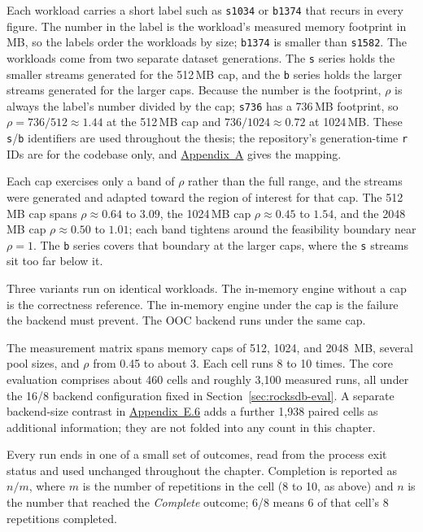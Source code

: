 Each workload carries a short label such as \texttt{s1034} or \texttt{b1374} that recurs in every figure.
The number in the label is the workload's measured memory footprint in MB, so the labels order the workloads by size; \texttt{b1374} is smaller than \texttt{s1582}.
The workloads come from two separate dataset generations.
The \texttt{s} series holds the smaller streams generated for the 512\,MB cap, and the \texttt{b} series holds the larger streams generated for the larger caps.
Because the number is the footprint, $\rho$ is always the label's number divided by the cap; \texttt{s736} has a 736\,MB footprint, so $\rho = 736/512 \approx 1.44$ at the 512\,MB cap and $736/1024 \approx 0.72$ at 1024\,MB.
These \texttt{s}/\texttt{b} identifiers are used throughout the thesis; the repository's generation-time \texttt{r} IDs are for the codebase only, and \hyperref[app:workload-map]{Appendix~A} gives the mapping.

Each cap exercises only a band of $\rho$ rather than the full range, and the streams were generated and adapted toward the region of interest for that cap.
The 512\,MB cap spans $\rho \approx 0.64$ to $3.09$, the 1024\,MB cap $\rho \approx 0.45$ to $1.54$, and the 2048\,MB cap $\rho \approx 0.50$ to $1.01$; each band tightens around the feasibility boundary near $\rho = 1$.
The \texttt{b} series covers that boundary at the larger caps, where the \texttt{s} streams sit too far below it.

Three variants run on identical workloads.
The in-memory engine without a cap is the correctness reference.
The in-memory engine under the cap is the failure the backend must prevent.
The \ac{OOC} backend runs under the same cap.

The measurement matrix spans memory caps of 512, 1024, and 2048\, MB, several pool sizes, and $\rho$ from 0.45 to about 3.
Each cell runs 8 to 10 times.
The core evaluation comprises about 460 cells and roughly 3{,}100 measured runs, all under the 16/8 backend configuration fixed in Section~\ref{sec:rocksdb-eval}.
A separate backend-size contrast in \hyperref[app:rb32]{Appendix~E.6} adds a further 1{,}938 paired cells as additional information; they are not folded into any count in this chapter.

Every run ends in one of a small set of outcomes, read from the process exit status and used unchanged throughout the chapter.
Completion is reported as $n/m$, where $m$ is the number of repetitions in the cell (8 to 10, as above) and $n$ is the number that reached the \emph{Complete} outcome; 6/8 means 6 of that cell's 8 repetitions completed.

